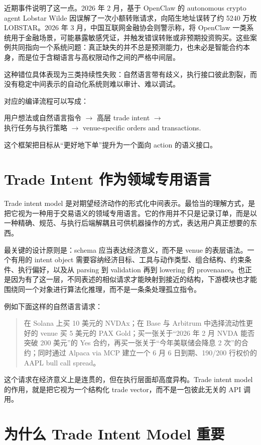 \documentclass{article}
\begin{document}
近期事件说明了这一点。2026 年 2 月，基于 OpenClaw 的 autonomous crypto agent Lobstar Wilde 因误解了一次小额转账请求，向陌生地址误转了约 5240 万枚 LOBSTAR。2026 年 3 月，中国互联网金融协会则警示称，将 OpenClaw 一类系统用于金融场景，可能暴露敏感凭证，并触发错误转账或非预期投资购买。这些案例共同指向一个系统问题：真正缺失的并不总是预测能力，也未必是智能合约本身，而是位于含糊语言与高权限动作之间的严格中间层。

这种错位具体表现为三类持续性失败：自然语言带有歧义，执行接口彼此割裂，而没有稳定中间表示的自动化系统则难以审计、难以调试。

对应的编译流程可以写成：
\begin{center}
\small
用户想法或自然语言指令 $\rightarrow$ 高层 trade intent $\rightarrow$ \\
执行任务与执行策略 $\rightarrow$ venue-specific orders and transactions.
\end{center}
这个框架把目标从“更好地下单”提升为一个面向 action 的语义接口。

\section{Trade Intent 作为领域专用语言}

Trade intent model 是对期望经济动作的形式化中间表示。最恰当的理解方式，是把它视为一种用于交易语义的领域专用语言。它的作用并不只是记录订单，而是以一种精确、规范、与执行后端解耦且可供机器操作的方式，表达用户真正想要的东西。

最关键的设计原则是：schema 应当表达经济意义，而不是 venue 的表层语法。一个有用的 intent object 需要容纳经济目标、工具与动作类型、组合结构、约束条件、执行偏好，以及从 parsing 到 validation 再到 lowering 的 provenance。也正是因为有了这一层，不同表述的相似请求才能映射到接近的结构，下游模块也才能围绕同一个对象进行算法化推理，而不是一条条处理孤立指令。

例如下面这样的自然语言请求：
\begin{quote}
\small
在 Solana 上买 10 美元的 NVDAx；在 Base 与 Arbitrum 中选择流动性更好的 venue 买 5 美元的 PAX Gold；买一张关于“2026 年 2 月 NVDA 能否突破 200 美元”的 Yes 合约，再买一张关于“今年美联储会降息 2 次”的合约；同时通过 Alpaca via MCP 建立一个 6 月 6 日到期、190/200 行权价的 AAPL bull call spread。
\end{quote}
这个请求在经济意义上是连贯的，但在执行层面却高度异构。Trade intent model 的作用，就是把它视为一个结构化 trade vector，而不是一包彼此无关的 API 调用。

\section{为什么 Trade Intent Model 重要}
\end{document}
